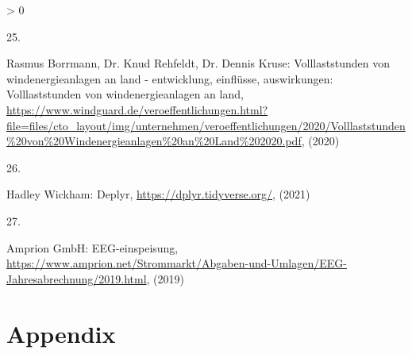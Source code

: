 \documentclass[a4paper,11pt]{article}
\newlength{\cslhangindent}
\newlength{\csllabelwidth}
\newenvironment{CSLReferences}[3] %
 {%
  \setlength{\parindent}{0pt}
  \ifodd #1 \everypar{\setlength{\hangindent}{\cslhangindent}}\ignorespaces\fi
  \ifnum #2 > 0
  \setlength{\parskip}{#2\baselineskip}
  \fi
 }%
 {}
\newcommand{\CSLLeftMargin}[1]{\parbox[t]{\maxof{\widthof{#1}}{\csllabelwidth}}{#1}}
\newcommand{\CSLRightInline}[1]{\parbox[t]{\linewidth}{#1}}
\begin{document}
\begin{CSLReferences}{0}{0}
\leavevmode\hypertarget{ref-RasmusBorrmannDr.KnudRehfeldtDr.DennisKruse.2020}{}%
\CSLLeftMargin{25. }
\CSLRightInline{Rasmus Borrmann, Dr. Knud Rehfeldt, Dr. Dennis Kruse: Volllaststunden von windenergieanlagen an land - entwicklung, einfl{ü}sse, auswirkungen: Volllaststunden von windenergieanlagen an land, \url{https://www.windguard.de/veroeffentlichungen.html?file=files/cto_layout/img/unternehmen/veroeffentlichungen/2020/Volllaststunden\%20von\%20Windenergieanlagen\%20an\%20Land\%202020.pdf}, (2020)}

\leavevmode\hypertarget{ref-HadleyWickham.2021}{}%
\CSLLeftMargin{26. }
\CSLRightInline{Hadley Wickham: Deplyr, \url{https://dplyr.tidyverse.org/}, (2021)}

\leavevmode\hypertarget{ref-AmprionGmbH.2019}{}%
\CSLLeftMargin{27. }
\CSLRightInline{Amprion GmbH: EEG-einspeisung, \url{https://www.amprion.net/Strommarkt/Abgaben-und-Umlagen/EEG-Jahresabrechnung/2019.html}, (2019)}

\end{CSLReferences}
\indent
\setlength{\parindent}{17pt}
\setlength{\leftskip}{0pt}
\setlength{\parskip}{0pt}

\newpage

\appendix

\hypertarget{appendix}{%
\section{Appendix}\label{appendix}}
\end{document}
